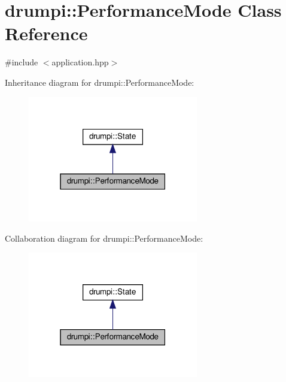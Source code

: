 \hypertarget{classdrumpi_1_1PerformanceMode}{}\section{drumpi\+:\+:Performance\+Mode Class Reference}
\label{classdrumpi_1_1PerformanceMode}


{\ttfamily \#include $<$application.\+hpp$>$}



Inheritance diagram for drumpi\+:\+:Performance\+Mode\+:
\nopagebreak
\begin{figure}[H]
\begin{center}
\leavevmode
\includegraphics[width=211pt]{classdrumpi_1_1PerformanceMode__inherit__graph}
\end{center}
\end{figure}


Collaboration diagram for drumpi\+:\+:Performance\+Mode\+:
\nopagebreak
\begin{figure}[H]
\begin{center}
\leavevmode
\includegraphics[width=211pt]{classdrumpi_1_1PerformanceMode__coll__graph}
\end{center}
\end{figure}
